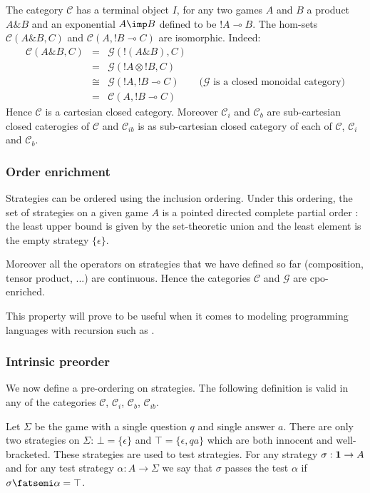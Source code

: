 The category $\mathcal{C}$ has a terminal object $I$, for any two games $A$ and $B$ a product $A \& B$ and
an exponential $A \imp B$ defined to be $!A \multimap B$. The hom-sets $\mathcal{C}(A \& B,C)$ and
$\mathcal{C}(A,!B \multimap C)$ are isomorphic. Indeed:
\begin{eqnarray*}
\mathcal{C}(A\& B,C) &=& \mathcal{G}(!(A\& B),C) \\
&=& \mathcal{G}({!A}\otimes {!B},C) \\
&\cong& \mathcal{G}({!A}, {!B} \multimap C) \qquad  \mbox{($\mathcal{G}$ is a closed monoidal category)}\\
&=& \mathcal{C}(A, {!B} \multimap C)
\end{eqnarray*}
Hence $\mathcal{C}$ is a cartesian closed category. Moreover $\mathcal{C}_i$ and $\mathcal{C}_b$
are sub-cartesian closed caterogies of $\mathcal{C}$ and $\mathcal{C}_{ib}$ is as sub-cartesian closed category
of each of $\mathcal{C}$, $\mathcal{C}_i$ and $\mathcal{C}_b$.





\subsubsection{Order enrichment}

Strategies can be ordered using the inclusion ordering. Under this
ordering, the set of strategies on a given game $A$ is a pointed
directed complete partial order : the least upper bound is given by
the set-theoretic union and the least element is the empty strategy
$\{ \epsilon \}$.

Moreover all the operators on strategies that we have defined so far
(composition, tensor product, ...) are continuous. Hence the
categories $\mathcal{C}$ and $\mathcal{G}$ are cpo-enriched.

This property will prove to be useful when it comes to modeling
programming languages with recursion such as \pcf.


\subsubsection{Intrinsic preorder}

We now define a pre-ordering on strategies. The following definition
is valid in any of the categories $\mathcal{C}$, $\mathcal{C}_i$,
$\mathcal{C}_b$, $\mathcal{C}_{ib}$.

Let $\Sigma$ be the game with a single question $q$ and single
answer $a$. There are only two strategies on $\Sigma$: $\bot = \{
\epsilon \}$ and $\top = \{ \epsilon, q a \}$ which are both
innocent and well-bracketed. These strategies are used to test
strategies. For any strategy $\sigma : {\bf 1} \rightarrow A$ and
for any test strategy $\alpha : A \rightarrow \Sigma$ we say that
$\sigma$ passes the test $\alpha$ if $\sigma \fatsemi \alpha =
\top$.

